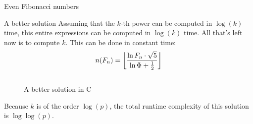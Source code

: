 \documentclass[main.tex]{subfiles}
\begin{document}
\begin{prob}{2}{Even Fibonacci numbers}
\begin{solutions}
\begin{solution}{A better solution}
      Assuming that the $k$-th power can be computed in $\log(k)$ time, this entire expressions can be computed in $\log(k)$ time.
      All that's left now is to compute $k$.
      This can be done in constant time:
      \[ n(F_n) = \floor*{\frac{\ln{F_n \cdot \sqrt{5}}}{\ln{\Phi}+\frac{1}{2}}} \]

      \begin{figure}[H]
        \inputminted[firstline=19, lastline=30]{c}{\sol{002}{c}/solution.c}
        \caption{A better solution in C}
      \end{figure}

      Because $k$ is of the order $\log(p)$, the total runtime complexity of this solution is $\log\log(p)$.
    \end{solution}
  \end{solutions}
\end{prob}
\end{document}
